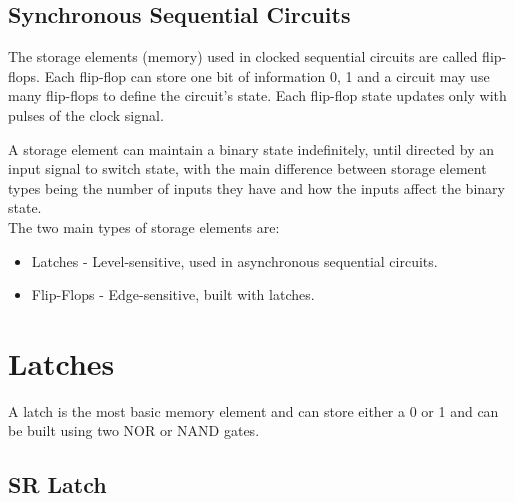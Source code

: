 \documentclass[12pt letter]{report}
\begin{document}
\subsection{Synchronous Sequential Circuits}


The storage elements (memory) used in clocked sequential circuits are called flip-flops. Each flip-flop can store one
bit of information 0, 1 and a circuit may use many flip-flops to define the circuit's state. Each flip-flop state
updates only with pulses of the clock signal.


A storage element can maintain a binary state indefinitely, until directed by an input signal to switch state, with the
main difference between storage element types being the number of inputs they have and how the inputs affect the binary
state.\\
The two main types of storage elements are:
\begin{itemize}
  \item Latches - Level-sensitive, used in asynchronous sequential circuits.
  \item Flip-Flops - Edge-sensitive, built with latches.
\end{itemize}


\section{Latches}


A latch is the most basic memory element and can store either a 0  or 1 and can be built using two NOR or NAND gates.

\subsection{SR Latch}
\end{document}
